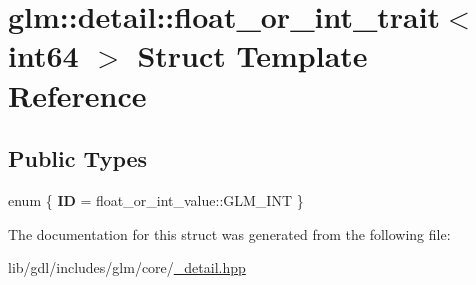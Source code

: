 \hypertarget{structglm_1_1detail_1_1float__or__int__trait_3_01int64_01_4}{}\section{glm\+:\+:detail\+:\+:float\+\_\+or\+\_\+int\+\_\+trait$<$ int64 $>$ Struct Template Reference}
\label{structglm_1_1detail_1_1float__or__int__trait_3_01int64_01_4}
\subsection*{Public Types}
\begin{DoxyCompactItemize}
\item 
\hypertarget{structglm_1_1detail_1_1float__or__int__trait_3_01int64_01_4_a7d4d4cf5749af4fa2864d31f05fa19b6}{}enum \{ {\bfseries I\+D} = float\+\_\+or\+\_\+int\+\_\+value\+:\+:G\+L\+M\+\_\+\+I\+N\+T
 \}\label{structglm_1_1detail_1_1float__or__int__trait_3_01int64_01_4_a7d4d4cf5749af4fa2864d31f05fa19b6}

\end{DoxyCompactItemize}


The documentation for this struct was generated from the following file\+:\begin{DoxyCompactItemize}
\item 
lib/gdl/includes/glm/core/\hyperlink{__detail_8hpp}{\+\_\+detail.\+hpp}\end{DoxyCompactItemize}

